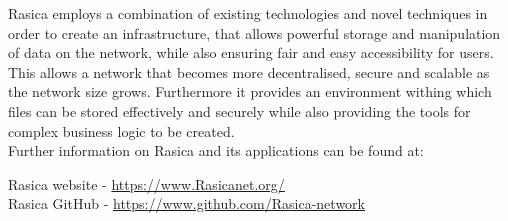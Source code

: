 Rasica employs a combination of existing technologies and novel techniques in order to create an infrastructure, that allows powerful storage and manipulation of data on the network, while also ensuring fair and easy accessibility for users. This allows a network that becomes more decentralised, secure and scalable as the network size grows. Furthermore it provides an environment withing which files can be stored effectively and securely while also providing the tools for complex business logic to be created.  \\

Further information on Rasica and its applications can be found at: \\
\begin{center}
Rasica website - \url{https://www.Rasicanet.org/}\\
Rasica GitHub - \url{https://www.github.com/Rasica-network}\\
\end{center}